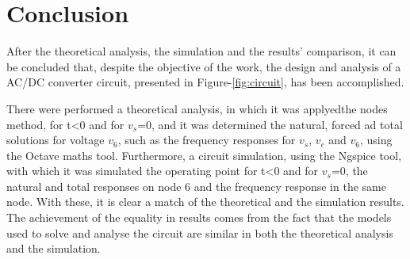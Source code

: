 \section{Conclusion}
\label{sec:conclusion}

After the theoretical analysis, the simulation and the results' comparison, it can be
concluded that, despite the objective of the work, the design and analysis of a AC/DC converter
circuit, presented in Figure-\ref{fig:circuit}, has been accomplished.\par

There were performed a theoretical analysis, in which it was applyedthe nodes method,
for t<0 and for $v_s$=0, and it was determined the natural, forced ad total solutions for
voltage $v_6$, such as the frequency responses for $v_s$, $v_c$ and $v_6$, using the Octave
maths tool. Furthermore, a circuit simulation, using the Ngspice tool, with which it was
simulated the operating point for t<0 and for $v_s$=0, the natural and total responses on node 6
and the frequency response in the same node. With these, it is clear a match of the theoretical
and the simulation results. The achievement of the equality in results comes from the fact that the models used to solve and analyse the circuit are similar in both the theoretical analysis and the simulation.

